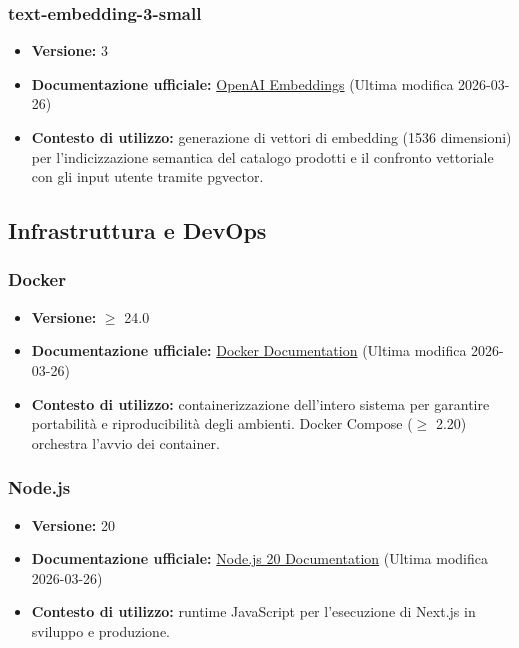 \documentclass[a4paper, 11pt, oneside]{scrartcl}
\begin{document}
\subsubsection{text-embedding-3-small}
\begin{itemize}[noitemsep]
    \item \textbf{Versione:} 3
    \item \textbf{Documentazione ufficiale:} \href{https://platform.openai.com/docs/guides/embeddings}{OpenAI Embeddings} (Ultima modifica 2026-03-26)
    \item \textbf{Contesto di utilizzo:} generazione di vettori di embedding (1536 dimensioni) per l'indicizzazione semantica del catalogo prodotti e il confronto vettoriale con gli input utente tramite pgvector.
\end{itemize}

\subsection{Infrastruttura e DevOps}

\subsubsection{Docker}
\begin{itemize}[noitemsep]
    \item \textbf{Versione:} $\geq$ 24.0
    \item \textbf{Documentazione ufficiale:} \href{https://docs.docker.com/}{Docker Documentation} (Ultima modifica 2026-03-26)
    \item \textbf{Contesto di utilizzo:} containerizzazione dell'intero sistema per garantire portabilit\`a e riproducibilit\`a degli ambienti. Docker Compose ($\geq$ 2.20) orchestra l'avvio dei container.
\end{itemize}

\subsubsection{Node.js}
\begin{itemize}[noitemsep]
    \item \textbf{Versione:} 20
    \item \textbf{Documentazione ufficiale:} \href{https://nodejs.org/docs/latest-v20.x/api/}{Node.js 20 Documentation} (Ultima modifica 2026-03-26)
    \item \textbf{Contesto di utilizzo:} runtime JavaScript per l'esecuzione di Next.js in sviluppo e produzione.
\end{itemize}
\end{document}
